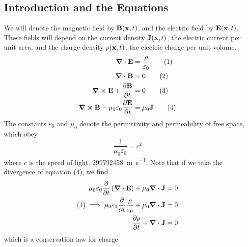 \subsection{Introduction and the Equations}
We will denote the magnetic field by \(\vb B(\vb x, t)\), and the electric field by \(\vb E(\vb x, t)\). These fields will depend on the current density \(\vb J(\vb x, t)\), the electric current per unit area, and the charge density \(\rho(\vb x, t)\), the electric charge per unit volume.
\begin{align}
	\div{\vb E}                                      & = \frac{\rho}{\varepsilon_0} \tag{1} \\
	\div{\vb B}                                      & = 0                          \tag{2} \\
	\curl{\vb E} + \pdv{\vb B}{t}                    & = 0                          \tag{3} \\
	\curl{\vb B} - \mu_0\varepsilon_0 \pdv{\vb E}{t} & = \mu_0 \vb J \tag{4}
\end{align}
The constants \(\varepsilon_0\) and \(\mu_0\) denote the permittivity and permeability of free space, which obey
\[ \frac{1}{\mu_0 \varepsilon_0} = c^2 \]
where \(c\) is the speed of light, \SI{299792458}{\metre\per\second}. Note that if we take the divergence of equation (4), we find
\begin{align*}
	\mu_0 \varepsilon_0 \pdv{t}\left( \div{\vb E} \right) + \mu_0 \div{\vb J}              & = 0 \\
	(1) \implies \mu_0 \varepsilon_0 \pdv{t}\frac{\rho}{\varepsilon_0} + \mu_0 \div{\vb J} & = 0 \\
	\pdv{\rho}{t} + \div{\vb J}                                                            & = 0 \\
\end{align*}
which is a conservation law for charge.

